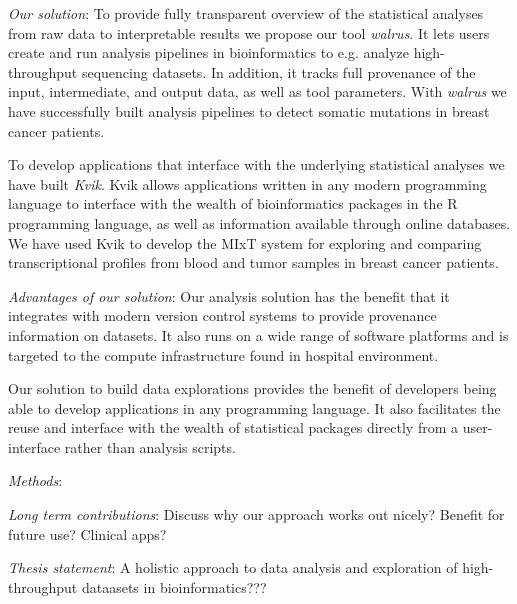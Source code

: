 \emph{Our solution}: 
To provide fully transparent overview of the statistical analyses from raw data
to interpretable results we propose our tool \emph{walrus}. It lets users create
and run analysis pipelines in bioinformatics to e.g. analyze high-throughput
sequencing datasets. In addition, it tracks full provenance of the input,
intermediate, and output data, as well as tool parameters. With \emph{walrus} we
have successfully built analysis pipelines to detect somatic mutations in breast
cancer patients. 

To develop applications that interface with the underlying statistical analyses
we have built \emph{Kvik}. Kvik allows applications written in any modern
programming language to interface with the wealth of bioinformatics packages in
the R programming language, as well as information available through online
databases. We have used Kvik to develop the MIxT system for exploring and
comparing transcriptional profiles from blood and tumor samples in breast cancer
patients. 

\emph{Advantages of our solution}:
Our analysis solution has the benefit that it integrates with modern version
control systems to provide provenance information on datasets. It also runs on a
wide range of software platforms and is targeted to the compute infrastructure
found in hospital environment. 

Our solution to build data explorations provides the benefit of developers being
able to develop applications in any programming language. It also facilitates
the reuse and interface with the wealth of statistical packages directly from a
user-interface rather than analysis scripts. 

\emph{Methods}:

\emph{Long term contributions}:
Discuss why our approach works out nicely? Benefit for future use? Clinical
apps? 

\emph{Thesis statement}:
A holistic approach to data analysis and exploration of high-throughput
dataasets in bioinformatics??? 


